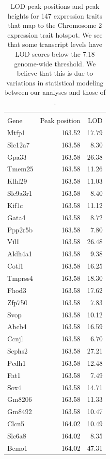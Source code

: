\documentclass[oneside]{book}\usepackage[]{graphicx}\usepackage[]{color}
\begin{document}
\begin{appendices}
{\tiny
\begin{longtable}{lrr}
\caption{LOD peak positions and peak heights for 147 expression traits that map to the Chromosome 2 expression trait hotspot. We see that some transcript levels have LOD scores below the 7.18 genome-wide threshold. We believe that this is due to variations in statistical modeling between our analyses and those of \citet{keller2018genetic}.}\\ 
\hline \\

Gene & Peak position & LOD \\
  \hline
Mtfp1 & 163.52 & 17.79 \\
  Slc12a7 & 163.58 & 8.30 \\
  Gpa33 & 163.58 & 26.38 \\
  Tmem25 & 163.58 & 11.26 \\
  Klhl29 & 163.58 & 11.03 \\
  Slc9a3r1 & 163.58 & 8.40 \\
  Kif1c & 163.58 & 11.12 \\
  Gata4 & 163.58 & 8.72 \\
  Ppp2r5b & 163.58 & 7.80 \\
  Vil1 & 163.58 & 26.48 \\
  Aldh4a1 & 163.58 & 9.38 \\
  Cotl1 & 163.58 & 16.25 \\
  Tmprss4 & 163.58 & 18.30 \\
  Fhod3 & 163.58 & 17.62 \\
  Zfp750 & 163.58 & 7.83 \\
  Svop & 163.58 & 10.12 \\
  Abcb4 & 163.58 & 16.59 \\
  Ccnjl & 163.58 & 6.70 \\
  Sephs2 & 163.58 & 27.21 \\
  Pcdh1 & 163.58 & 12.48 \\
  Fat1 & 163.58 & 7.49 \\
  Sox4 & 163.58 & 14.71 \\
  Gm8206 & 163.58 & 11.33 \\
  Gm8492 & 163.58 & 10.47 \\
  Clcn5 & 164.02 & 10.49 \\
  Slc6a8 & 164.02 & 8.35 \\
  Bcmo1 & 164.02 & 47.31 \\

\end{longtable}}
\end{appendices}
\end{document}
